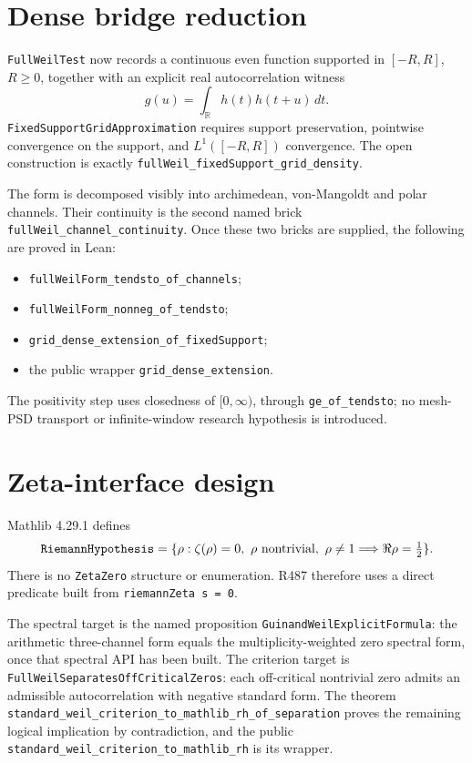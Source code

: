 \documentclass[11pt]{article}
\newcommand{\code}[1]{\nolinkurl{#1}}
\begin{document}
\section{Dense bridge reduction}

\code{FullWeilTest} now records a continuous even function supported in
\([ -R,R]\), \(R\geq0\), together with an explicit real
autocorrelation witness
\[
 g(u)=\int_{\mathbb R}h(t)h(t+u)\,dt .
\]
\code{FixedSupportGridApproximation} requires support preservation,
pointwise convergence on the support, and \(L^1([-R,R])\) convergence.
The open construction is exactly
\code{fullWeil_fixedSupport_grid_density}.

The form is decomposed visibly into archimedean, von-Mangoldt and polar
channels.  Their continuity is the second named brick
\code{fullWeil_channel_continuity}.  Once these two bricks are supplied,
the following are proved in Lean:
\begin{itemize}
\item \code{fullWeilForm_tendsto_of_channels};
\item \code{fullWeilForm_nonneg_of_tendsto};
\item \code{grid_dense_extension_of_fixedSupport};
\item the public wrapper \code{grid_dense_extension}.
\end{itemize}
The positivity step uses closedness of \([0,\infty)\), through
\code{ge_of_tendsto}; no mesh-PSD transport or infinite-window research
hypothesis is introduced.

\section{Zeta-interface design}

Mathlib 4.29.1 defines
\[
\text{\ttfamily RiemannHypothesis}
=\{\rho:\zeta(\rho)=0,\ \rho\hbox{ nontrivial},\ \rho\ne1
\Longrightarrow \Re\rho=\tfrac12\}.
\]
There is no \code{ZetaZero} structure or enumeration.  R487 therefore
uses a direct predicate built from \code{riemannZeta s = 0}.

The spectral target is the named proposition
\code{GuinandWeilExplicitFormula}: the arithmetic three-channel form
equals the multiplicity-weighted zero spectral form, once that spectral
API has been built.  The criterion target is
\code{FullWeilSeparatesOffCriticalZeros}: each off-critical nontrivial
zero admits an admissible autocorrelation with negative standard form.
The theorem
\code{standard_weil_criterion_to_mathlib_rh_of_separation} proves the
remaining logical implication by contradiction, and the public
\code{standard_weil_criterion_to_mathlib_rh} is its wrapper.
\end{document}
